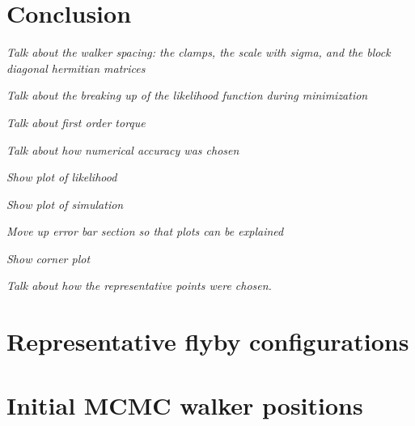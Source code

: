 \documentclass[linenumbers]{aastex631}
\newcommand{\jtd}[1]{{\color{red}\textit{#1}}}
\begin{document}
\section{Conclusion}


\jtd{Talk about the walker spacing: the clamps, the scale with sigma, and the block diagonal hermitian matrices}

\jtd{Talk about the breaking up of the likelihood function during minimization}

\jtd{Talk about first order torque}

\jtd{Talk about how numerical accuracy was chosen}

\jtd{Show plot of likelihood}

\jtd{Show plot of simulation}

\jtd{Move up error bar section so that plots can be explained}

\jtd{Show corner plot}

\jtd{Talk about how the representative points were chosen.}


\vspace{5mm}



\appendix

\section{Representative flyby configurations}


\section{Initial MCMC walker positions}



{}

\end{document}
